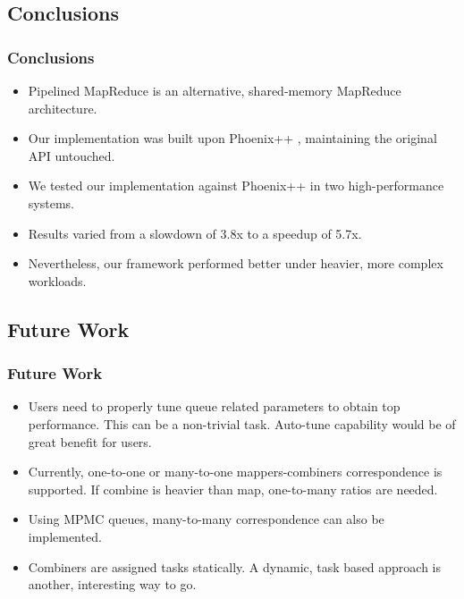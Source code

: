 \subsection{Conclusions}

\begin{frame}
	\frametitle{Conclusions}
	\begin{itemize}
		\item Pipelined MapReduce is an alternative, shared-memory MapReduce architecture.
		\item Our implementation was built upon Phoenix++ , maintaining the original API untouched.
		\item We tested our implementation against Phoenix++ in two high-performance systems.
		\item Results varied from a slowdown of 3.8x to a speedup of 5.7x.
		\item Nevertheless, our framework performed better under heavier, more complex workloads.
	\end{itemize}
\end{frame}

\subsection{Future Work}
\begin{frame}
	\frametitle{Future Work}
	\begin{itemize}
		\item Users need to properly tune queue related parameters to obtain top performance. This can be a non-trivial task. Auto-tune capability would be of great benefit for users.
		\item Currently, one-to-one or many-to-one mappers-combiners correspondence is supported. If combine is heavier than map, one-to-many ratios are needed.
		\item Using MPMC queues, many-to-many correspondence can also be implemented.
		\item Combiners are assigned tasks statically. A dynamic, task based approach is another, interesting way to go.
	\end{itemize}
\end{frame}